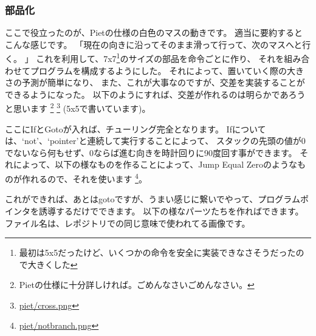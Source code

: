 \documentclass[twocolumn,8pt,b5paper]{extarticle}
\begin{document}
\subsubsection{部品化}
ここで役立ったのが、Pietの仕様の白色のマスの動きです。 
適当に要約するとこんな感じです。
「現在の向きに沿ってそのまま滑って行って、次のマスへと行く。 」
これを利用して、7x7\footnote{最初は5x5だったけど、いくつかの命令を安全に実装できなさそうだったので大きくした}のサイズの部品を命令ごとに作り、 
それを組み合わせてプログラムを構成するようにした。 それによって、置いていく際の大きさの予測が簡単になり、 
また、これが大事なのですが、交差を実装することができるようになった。 以下のようにすれば、交差が作れるのは明らかであろうと思います 
\footnote{Pietの仕様に十分詳しければ。ごめんなさいごめんなさい。} 
\footnote{\href{https://github.com/nna774/piet-automata/blob/master/piet/cross.png}{piet/cross.png}} (5x5で書いています)。

\hfil{}\hfil

ここにIfとGotoが入れば、チューリング完全となります。
Ifについては、`not'、`pointer'と連続して実行することによって、
スタックの先頭の値が0でないなら何もせず、0ならば進む向きを時計回りに90度回す事ができます。
それによって、以下の様なものを作ることによって、Jump Equal Zeroのようなものが作れるので、それを使います
\footnote{\href{https://github.com/nna774/piet-automata/blob/master/piet/notbranch.png}{piet/notbranch.png}}。

\hfil{}\hfil

これができれば、あとはgotoですが、うまい感じに繋いでやって、プログラムポインタを誘導するだけでできます。 
以下の様なパーツたちを作ればできます。ファイル名は、レポジトリでの同じ意味で使われてる画像です。
\end{document}
